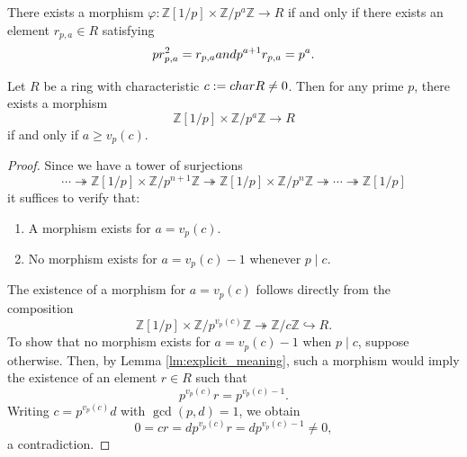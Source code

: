 \documentclass[10pt,a4paper]{amsart}
\newcommand{\Z}{{\mathbb Z}}
\newcommand{\chara}{{\textup{char}}}
\begin{document}
    \begin{lemma}
    \label{lm:explicit_meaning}
        There exists a morphism $\varphi: \Z[1/p] \times \Z/p^a\Z \to R$ if and only if there exists an element $r_{p,a} \in R$ satisfying
        $$
        pr_{p,a}^2 = r_{p,a} \textup{ and } p^{a+1}r_{p,a} = p^a.
        $$
    \end{lemma}

    \begin{lemma}
        Let $R$ be a ring with characteristic $c := \chara{R} \not= 0$.
        Then for any prime $p$, there exists a morphism
        $$
        \Z[1/p] \times \Z/p^{a}\Z \to R
        $$
        if and only if $a \geq v_p(c)$.
    \end{lemma}

    \begin{proof}
        Since we have a tower of surjections
        $$
        \cdots \twoheadrightarrow
        \Z[1/p] \times \Z/p^{n+1}\Z \twoheadrightarrow
        \Z[1/p] \times \Z/p^{n}\Z \twoheadrightarrow
        \cdots \twoheadrightarrow \Z[1/p]
        $$
        it suffices to verify that:
        \begin{enumerate}
            \item[1.]
            A morphism exists for $a = v_p(c)$.

            \item[2.]
            No morphism exists for $a = v_p(c) - 1$ whenever $p \mid c$.
        \end{enumerate}
        The existence of a morphism for $a = v_p(c)$ follows directly from the composition
        $$
        \Z[1/p] \times \Z/p^{v_p(c)}\Z \twoheadrightarrow
        \Z/c\Z \hookrightarrow
        R.
        $$
        To show that no morphism exists for $a = v_p(c) - 1$ when $p \mid c$, suppose otherwise.
        Then, by Lemma \ref{lm:explicit_meaning}, such a morphism would imply the existence of an element $r \in R$ such that
        $$
        p^{v_p(c)}r = p^{v_p(c)-1}.
        $$
        Writing $c = p^{v_p(c)}d$ with $\gcd(p,d) = 1$, we obtain
        $$
        0 = cr = dp^{v_p(c)}r = dp^{v_p(c)-1} \not= 0,
        $$
        a contradiction.
    \end{proof}
\end{document}
